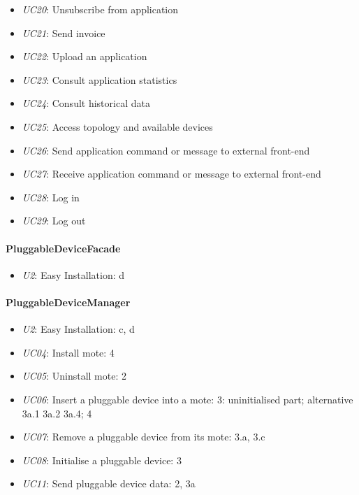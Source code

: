 \begin{itemize}
            \item \emph{UC20}: Unsubscribe from application
            \item \emph{UC21}: Send invoice
            \item \emph{UC22}: Upload an application
            \item \emph{UC23}: Consult application statistics
            \item \emph{UC24}: Consult historical data
            \item \emph{UC25}: Access topology and available devices
            \item \emph{UC26}: Send application command or message to external front-end
            \item \emph{UC27}: Receive application command or message to external front-end
            \item \emph{UC28}: Log in
            \item \emph{UC29}: Log out
        \end{itemize}

    \paragraph{PluggableDeviceFacade}
        \begin{itemize}
        	\item \emph{U2}: Easy Installation: d
        \end{itemize}

    \paragraph{PluggableDeviceManager}
        \begin{itemize}
            \item \emph{U2}: Easy Installation: c, d
            \item \emph{UC04}: Install mote: 4
            \item \emph{UC05}: Uninstall mote: 2
            \item \emph{UC06}: Insert a pluggable device into a mote: 3: uninitialised part; alternative 3a.1 3a.2 3a.4; 4
            \item \emph{UC07}: Remove a pluggable device from its mote: 3.a, 3.c
            \item \emph{UC08}: Initialise a pluggable device: 3
            \item \emph{UC11}: Send pluggable device data: 2, 3a
        \end{itemize}
